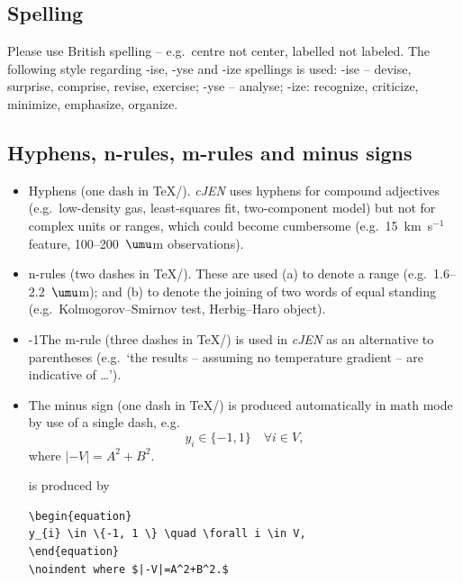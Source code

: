 \documentclass[]{cJEN2e}
\begin{document}
\subsection{Spelling}

Please  use British spelling -- e.g.\ centre not center, labelled
not  labeled. The following style regarding -ise, -yse and -ize
spellings  is used:  -ise -- devise,  surprise, comprise, revise,
exercise; -yse -- analyse; -ize: recognize, criticize, minimize,
emphasize, organize.

\subsection{Hyphens, n-rules, m-rules and minus signs}

\begin{itemize}
\item Hyphens (one dash in \TeX/\LaTeXe). {\it cJEN} uses hyphens for compound adjectives (e.g.\ low-density gas, least-squares fit,
two-component  model) but not for complex  units  or ranges, which could become cumbersome (e.g.\ 15~km~s$^{-1}$
feature, 100--200~$\umu$m observations).

\item n-rules (two dashes in \TeX/\LaTeXe). These are used  (a) to denote a range (e.g.\
1.6--2.2~$\umu$m); and (b) to denote the joining of two words of
equal standing (e.g.\ Kolmogorov--Smirnov  test, Herbig--Haro
object).

\item \looseness-1The  m-rule (three dashes in \TeX/\LaTeXe) is  used  in
{\it cJEN} as an alternative to parentheses (e.g.\  `the results -- assuming no temperature gradient -- are
indicative of \ldots').
\item The minus sign (one dash in \TeX/\LaTeXe) is produced
automatically in math mode by use of a single dash, e.g.
\begin{equation}
y_{i} \in \{-1, 1 \} \quad \forall i \in V,
\end{equation}
\noindent where $|-V|=A^2+B^2.$\medskip

\noindent is produced by

\begin{verbatim}
\begin{equation}
y_{i} \in \{-1, 1 \} \quad \forall i \in V,
\end{equation}
\noindent where $|-V|=A^2+B^2.$
\end{verbatim}

\end{itemize}
\end{document}
